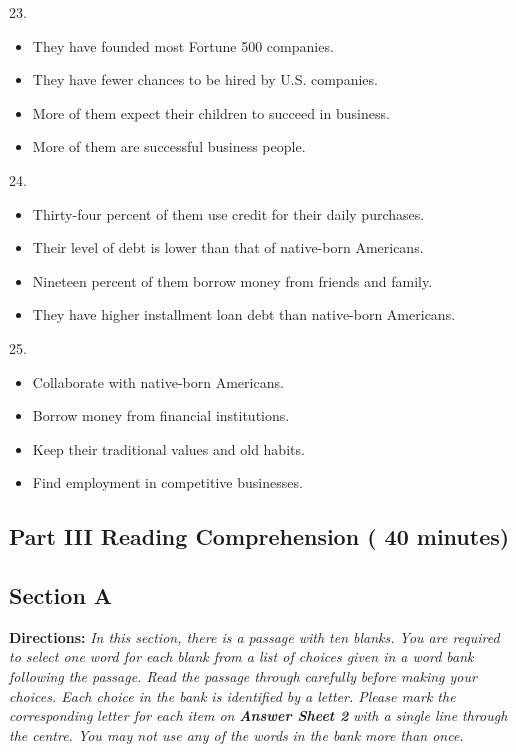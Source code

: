 \documentclass[UTF8,11pt]{ctexart}
\begin{document}
23.


\begin{itemize}[leftmargin=2em,itemsep=.2em,topsep=.4em]\item[A.] They have founded most Fortune 500 companies.
\item[B.] They have fewer chances to be hired by U.S. companies.
\item[C.] More of them expect their children to succeed in business.
\item[D.] More of them are successful business people.
\end{itemize}

24.


\begin{itemize}[leftmargin=2em,itemsep=.2em,topsep=.4em]\item[A.] Thirty-four percent of them use credit for their daily purchases.
\item[B.] Their level of debt is lower than that of native-born Americans.
\item[C.] Nineteen percent of them borrow money from friends and family.
\item[D.] They have higher installment loan debt than native-born Americans.
\end{itemize}

25.


\begin{itemize}[leftmargin=2em,itemsep=.2em,topsep=.4em]\item[A.] Collaborate with native-born Americans.
\item[B.] Borrow money from financial institutions.
\item[C.] Keep their traditional values and old habits.
\item[D.] Find employment in competitive businesses.
\end{itemize}

\subsection*{\textbf{Part III Reading Comprehension ( 40 minutes)}}


\subsection*{\textbf{Section A}}


\textbf{Directions:} \textit{In this section, there is a passage with ten blanks. You are required to select one word for each} \textit{blank from a list of choices given in a word bank following the passage. Read the passage through carefully} \textit{before making your choices. Each choice in the bank is identified by a letter. Please mark the corresponding} \textit{letter for each item on }\textbf{\textit{Answer Sheet 2}}\textit{ with a single line through the centre. You may not use any of the words} \textit{in the bank more than once.}
\end{document}
